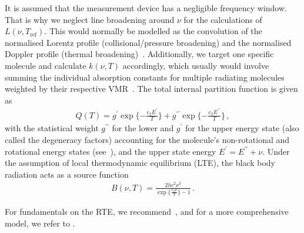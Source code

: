 It is assumed that the measurement device has a negligible frequency window.
That is why we neglect line broadening around $\nu$ for the calculations of $L(\nu, T_{\text{ref}})$.
This would normally be modelled as the convolution of the normalised Lorentz profile (collisional/pressure broadening) and the normalised Doppler profile (thermal broadening)~\cite{mipas2000handbook}.
Additionally, we target one specific molecule and calculate $k(\nu, T)$ accordingly, which usually would involve summing the individual absorption constants for multiple radiating molecules weighted by their respective VMR~\cite{mipas2000handbook}.
The total internal partition function is given as
\begin{align}
	Q(T )= g^{ \prime} \exp{\{ - \frac{ c_2 E^{ \prime} }{T}\}} + g^{\prime \prime} \exp{\{ - \frac{ c_2 E^{\prime \prime} }{T}\}} \, ,
\end{align}
with the statistical weight $ g^{\prime \prime}$ for the lower and $ g^{ \prime}$ for the upper energy state (also called the degeneracy factors) accounting for the molecule's non-rotational and rotational energy states (see~\cite{vsimevckova2006einstein}), and the upper state energy $E^{ \prime} = E^{ \prime\prime} + \nu$.
Under the assumption of local thermodynamic equilibrium (LTE), the black body radiation acts as a source function
\begin{align}
	B(\nu,T)   = \frac{2 h c^2 \nu^3}{\exp{\{\frac{c_2\nu}{ T}\}}-1}\, .
\end{align}

For fundamentals on the RTE, we recommend~\cite[Chapter 1]{rybicki2000rte}, and for a more comprehensive model, we refer to \cite{read2006forwardModel}.



